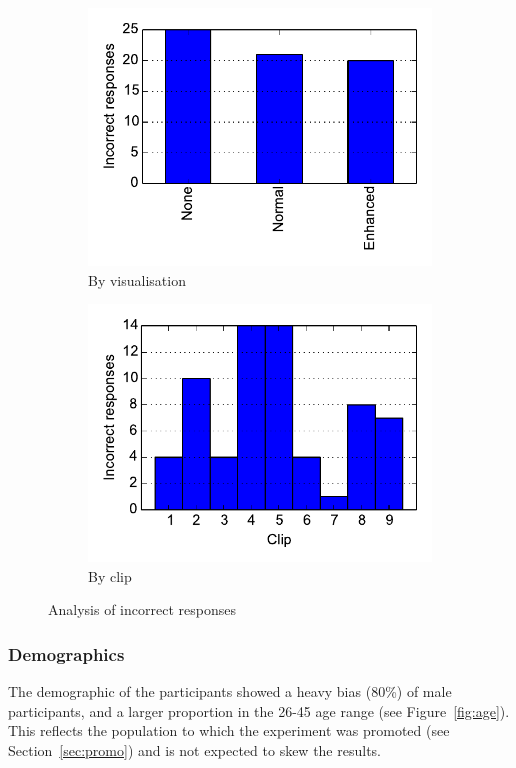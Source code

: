 \begin{figure}[ht]
\centering
\begin{subfigure}{.5\textwidth}
  \centering
  \includegraphics[width=\linewidth]{figs/rejects-vis.pdf}
  \caption{By visualisation}
  \label{fig:rejectvis}
\end{subfigure}%
\begin{subfigure}{.5\textwidth}
  \centering
  \includegraphics[width=\linewidth]{figs/rejects-clip.pdf}
  \caption{By clip}
  \label{fig:rejectclip}
\end{subfigure}
\caption{Analysis of incorrect responses}
\label{fig:rejects}
\end{figure}

\subsubsection{Demographics}
The demographic of the participants showed a heavy bias (80\%) of male
participants, and a larger proportion in the 26-45 age range (see
Figure~\ref{fig:age}). This reflects the population to which the experiment was
promoted (see Section~\ref{sec:promo}) and is not expected to skew the results.


